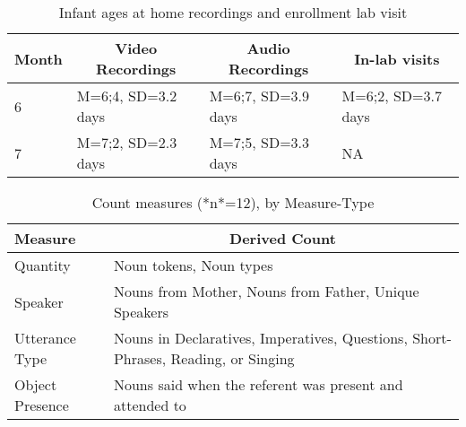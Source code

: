 \documentclass[man]{apa6}
\theoremstyle{definition}
\theoremstyle{definition}
\theoremstyle{definition}
\theoremstyle{remark}
\begin{document}
\begin{table}[tbp]
\begin{center}
\begin{threeparttable}
\caption{\label{tab:recording-ages-table}Infant ages at home recordings and enrollment lab visit}
\begin{tabular}{llll}
\toprule
Month & \multicolumn{1}{c}{Video Recordings} & \multicolumn{1}{c}{Audio Recordings} & \multicolumn{1}{c}{In-lab visits}\\
\midrule
6 & M=6;4, SD=3.2 days & M=6;7, SD=3.9 days & M=6;2, SD=3.7 days\\
7 & M=7;2, SD=2.3 days & M=7;5, SD=3.3 days & NA\\
\bottomrule
\end{tabular}
\end{threeparttable}
\end{center}
\end{table}
\pagebreak
\begin{table}[tbp]
\begin{center}
\begin{threeparttable}
\caption{\label{tab:measures-tab}Count measures (*n*=12), by Measure-Type}
\small{
\begin{tabular}{ll}
\toprule
Measure & \multicolumn{1}{c}{Derived Count}\\
\midrule
Quantity & Noun tokens, Noun types\\
Speaker & Nouns from Mother, Nouns from Father, Unique Speakers\\
Utterance Type & Nouns in Declaratives, Imperatives, Questions, Short-Phrases, Reading, or Singing\\
Object Presence & Nouns said when the referent was present and attended to\\
\bottomrule
\end{tabular}
}
\end{threeparttable}
\end{center}
\end{table}
\pagebreak
\end{document}

